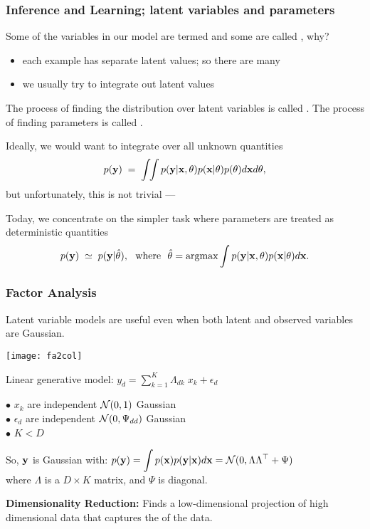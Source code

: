 \begin{frame}
\frametitle{Inference and Learning; latent variables and parameters}

Some of the variables in our model are termed 
and some are called , why?
\begin{itemize}
\item each example has separate latent values; so there are many
\item we usually try to integrate out latent values
\end{itemize}

The process of finding the distribution over latent variables is called
. The process of finding parameters is called .

Ideally, we would want to integrate over all unknown quantities
\[
p(\mathbf y)\;=\;\int\!\!\int p(\mathbf y|\mathbf x,\theta)p(\mathbf x|\theta)p(\theta)d\mathbf x d\theta,
\]
but unfortunately, this is not trivial --- 

Today, we concentrate on the simpler task where parameters are treated
as deterministic quantities
\[
p(\bfy)\;\simeq\;p(\bfy|\hat\theta), \text{\ \ where\ \ }
\hat\theta=\argmax\int p(\bfy|\bfx,\theta)p(\bfx|\theta)d\bfx.
\]
\end{frame}

\begin{frame}
\frametitle{Factor Analysis}

Latent variable models are useful even when both latent and observed
variables are Gaussian.

\vfill

\begin{minipage}{43mm}
\centerline{\texttt{[image: fa2col]}}
\end{minipage} \hspace{5mm}
\begin{minipage}{70mm}
Linear generative model: $\displaystyle
y_d = \sum_{k=1}^K \Lambda_{dk} \; x_k + \epsilon_d$

$\bullet$ $x_k$ are independent ${\cal N}(0,1)$ Gaussian  \\
$\bullet$ $\epsilon_d$ are
independent ${\cal N}(0,\Psi_{dd})$ Gaussian  \\
$\bullet$ $K\!<\!D$
\end{minipage}

So, $\mathbf y$ is Gaussian with: $\displaystyle
p(\mathbf y) = \int p(\mathbf x) p(\mathbf y|\mathbf x) d\mathbf x = {\cal N}(0,\Lambda \Lambda{\scriptsize^{\top}} +
\Psi) $ \\
where $\Lambda$ is a $D\times K$ matrix, and $\Psi$ is diagonal.

{\bf Dimensionality Reduction:} Finds a low-dimensional projection of
high dimensional data that captures the 
of the data.
\end{frame}

